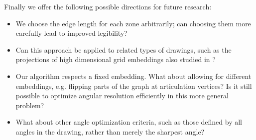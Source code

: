 \documentclass[11pt,letter]{article}
\begin{document}
Finally we offer the following possible directions for future research:
\begin{itemize}
\item We choose the edge length for each zone arbitrarily; can choosing them more carefully lead to improved legibility?
\item Can this approach be applied to related types of drawings, such as the projections of high dimensional grid embeddings also studied in \cite{Epp-GD-04}?
\item Our algorithm respects a fixed embedding.  What about allowing for different embeddings, e.g. flipping parts of the graph at articulation vertices?  Is it still possible to optimize angular resolution efficiently in this more general problem?
\item What about other angle optimization criteria, such as those defined by all angles in the drawing, rather than merely the sharpest angle?
\end{itemize}



\end{document}
